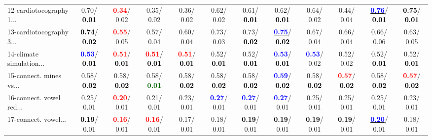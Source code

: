 \begin{table}[h]
\begin{center}
{\begin{tabular}{lc|c|c|c|c|c|c|c|c|c|c}
12-cardiotocography 1... &   0.70/\textcolor{black}{\textbf{  0.01}} & \textcolor{red}{\textbf{  0.34}}/  0.02 &   0.35/  0.02 &   0.36/  0.02 &   0.62/  0.02 &   0.61/\textcolor{black}{\textbf{  0.01}} &   0.62/\textcolor{black}{\textbf{  0.01}} &   0.64/  0.02 &   0.44/  0.04 & \underline{\textcolor{blue}{\textbf{  0.76}}}/\textcolor{black}{\textbf{  0.01}} & \textcolor{black}{\textbf{  0.75}}/\textcolor{black}{\textbf{  0.01}} \\
13-cardiotocography 3... & \textcolor{black}{\textbf{  0.74}}/\textcolor{black}{\textbf{  0.02}} & \textcolor{red}{\textbf{  0.55}}/  0.05 &   0.57/  0.04 &   0.60/  0.04 &   0.73/  0.03 &   0.73/\textcolor{black}{\textbf{  0.02}} & \underline{\textcolor{blue}{\textbf{  0.75}}}/\textcolor{black}{\textbf{  0.02}} &   0.67/  0.04 &   0.66/  0.04 &   0.66/  0.06 &   0.63/  0.05 \\
14-climate simulation... & \textcolor{blue}{\textbf{  0.53}}/\textcolor{black}{\textbf{  0.01}} & \textcolor{red}{\textbf{  0.51}}/\textcolor{black}{\textbf{  0.01}} & \textcolor{red}{\textbf{  0.51}}/\textcolor{black}{\textbf{  0.01}} & \textcolor{red}{\textbf{  0.51}}/\textcolor{black}{\textbf{  0.01}} &   0.52/\textcolor{black}{\textbf{  0.01}} &   0.52/\textcolor{black}{\textbf{  0.01}} & \textcolor{blue}{\textbf{  0.53}}/\textcolor{black}{\textbf{  0.01}} & \textcolor{blue}{\textbf{  0.53}}/  0.02 &   0.52/  0.02 &   0.52/\textcolor{black}{\textbf{  0.01}} &   0.52/\textcolor{black}{\textbf{  0.01}} \\ \hline
15-connect. mines vs... &   0.58/\textcolor{black}{\textbf{  0.02}} &   0.58/\textcolor{black}{\textbf{  0.02}} &   0.58/\textcolor{darkgreen}{\textbf{  0.01}} &   0.58/\textcolor{black}{\textbf{  0.02}} &   0.58/\textcolor{black}{\textbf{  0.02}} &   0.58/\textcolor{black}{\textbf{  0.02}} & \textcolor{blue}{\textbf{  0.59}}/\textcolor{black}{\textbf{  0.02}} &   0.58/\textcolor{black}{\textbf{  0.02}} & \textcolor{red}{\textbf{  0.57}}/\textcolor{black}{\textbf{  0.02}} &   0.58/\textcolor{black}{\textbf{  0.02}} & \textcolor{red}{\textbf{  0.57}}/\textcolor{black}{\textbf{  0.02}} \\
16-connect. vowel red... &   0.25/  0.01 & \textcolor{red}{\textbf{  0.20}}/  0.01 &   0.21/  0.01 &   0.23/  0.01 & \textcolor{blue}{\textbf{  0.27}}/  0.01 & \textcolor{blue}{\textbf{  0.27}}/  0.01 & \textcolor{blue}{\textbf{  0.27}}/  0.01 &   0.25/  0.01 &   0.25/  0.01 &   0.25/  0.01 &   0.23/  0.01 \\
17-connect. vowel... & \textcolor{black}{\textbf{  0.19}}/  0.01 & \textcolor{red}{\textbf{  0.16}}/  0.01 & \textcolor{red}{\textbf{  0.16}}/  0.01 &   0.17/  0.01 &   0.18/  0.01 & \textcolor{black}{\textbf{  0.19}}/  0.01 & \textcolor{black}{\textbf{  0.19}}/  0.01 & \textcolor{black}{\textbf{  0.19}}/  0.01 & \textcolor{black}{\textbf{  0.19}}/  0.01 & \underline{\textcolor{blue}{\textbf{  0.20}}}/  0.01 &   0.18/  0.01 \\

\end{tabular}}
\end{center}
\end{table}
